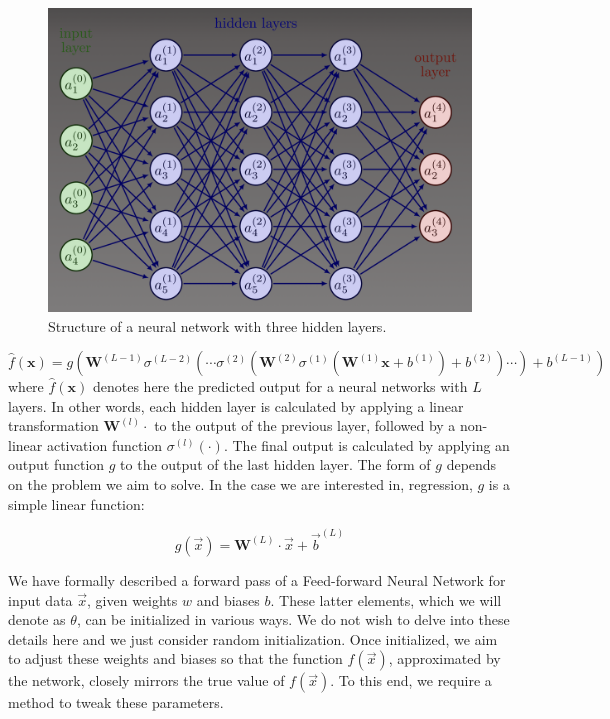 \begin{figure}[ht]
\centering
\includegraphics[width=\textwidth]{imgs/Architecture-perceptron-multi-couches-2.png}
\caption{Structure of a neural network with three hidden layers.}
\label{fig:mlp}
\end{figure}

\begin{equation}
\label{eq:mlp}
\hat{f}(\mathbf{x}) = g\left( \mathbf{W}^{(L-1)} \sigma^{(L-2)} \left( \cdots \sigma^{(2)} \left(
\mathbf{W}^{(2)} \sigma^{(1)} \left( \mathbf{W}^{(1)} \mathbf{x} + b^{(1)} \right) + b^{(2)} \right) \cdots \right) +
b^{(L-1)} \right)
\end{equation}
where $\hat{f}(\mathbf{x})$ denotes here the predicted output for a neural networks with $L$ layers. In other words, each hidden layer is calculated by applying a linear transformation $\mathbf{W}^{(l)} \cdot$ to the output of the previous layer, followed by a non-linear activation function $\sigma^{(l)}(\cdot)$. The final output is calculated by applying an output function $g$ to the output of the last hidden layer. The form of $g$ depends on the problem we aim to solve. In the case we are interested in, regression, $g$ is a simple linear function:

\begin{equation}
\label{eq:output-function}
g(\Vec{x}) = \mathbf{W}^{(L)} \cdot \Vec{x} + \Vec{b}^{(L)}
\end{equation}


We have formally described a forward pass of a Feed-forward Neural Network for input data $\Vec{x}$, given weights $w$ and biases $b$. These latter elements, which we will denote as $\theta$, can be initialized in various ways. We do not wish to delve into these details here and we just consider random initialization. Once initialized, we aim to adjust these weights and biases so that the function $\hat{f}(\Vec{x})$, approximated by the network, closely mirrors the true value of $f(\Vec{x})$. To this end, we require a method to tweak these parameters.

